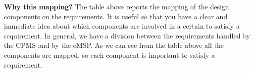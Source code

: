 \textbf{Why this mapping?} The table above reports the mapping of the design components on the requirements. It is useful so that you have a clear and immediate idea about which components are involved in a certain to satisfy a requirement. In general, we have a division between the requirements handled by the CPMS and by the eMSP. As we can see from the table above all the components are mapped, so each component is important to satisfy a requirement.